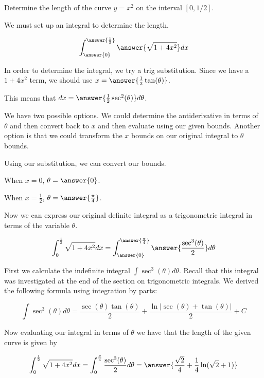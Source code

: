 \documentclass{ximera}
\author{Jason Miller}
\begin{document}
\begin{exercise}
Determine the length of the curve $y=x^{2}$ on the interval $[0,1/2]$. 

We must set up an integral to determine the length. 

\[
\int_{\answer{0}}^{\answer{\frac{1}{2}}} \answer{ \sqrt{1+4x^{2}}} dx
\]

\begin{exercise}

In order to determine the integral, we try a trig substitution.
Since we have a $1+4x^{2}$ term, we should use $x=\answer{\frac{1}{2}\tan(\theta)}$. 

This means that $dx= \answer{ \frac{1}{2}\sec^{2}(\theta)} d\theta$. 

We have two possible options. We could determine the antiderivative in terms of $\theta$ 
and then convert back to $x$ and then evaluate using our given bounds. 
Another option is that we could transform the $x$ bounds on our original integral to $\theta$ bounds. 

Using our substitution, we can convert our bounds.

When $x=0$, $\theta=\answer{0}$. 

When $x=\frac{1}{2}$, $\theta=\answer{\frac{\pi}{4}}$. 



\begin{exercise}


Now we can express our original definite integral as a trigonometric integral in terms of the variable $\theta$. 

\[
\int_{0}^{\frac{1}{2}} \sqrt{1+4x^{2}} dx= \int_{\answer{0}}^{\answer{\frac{\pi}{4}}}  \answer{\frac{\sec^{3}(\theta)}{2}}   d\theta
\]


First we calculate the indefinite integral $\int \sec^{3}(\theta) d\theta$. Recall that this integral was investigated at the end of the section on trigonometric integrals. 
We derived the following formula using integration by parts:

\[
\int \sec^{3}(\theta) d\theta=\frac{\sec(\theta)\tan(\theta)}{2} + \frac{ \ln| \sec(\theta) + \tan(\theta) | }{2} + C
\]

\begin{exercise}
Now evaluating our integral in terms of $\theta$ we have that the length of the given curve is given by

\[
\int_{0}^{\frac{1}{2}} \sqrt{1+4x^{2}} dx= \int_{0}^{\frac{\pi}{4}}  \frac{\sec^{3}(\theta)}{2}   d\theta =\answer{\frac{\sqrt{2}}{4} + \frac{1}{4}\ln(\sqrt{2}+1) }
\]




\end{exercise}
\end{exercise}

\end{exercise}

\end{exercise}
\end{document}
